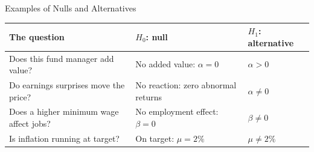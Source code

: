 \documentclass[9pt,english,aspectratio=169]{beamer}
\begin{document}
\begin{frame}{Examples of Nulls and Alternatives}

  \vspace{0.2em}
  {\small
  \begin{tabular}{@{} >{\raggedright\arraybackslash}p{4.9cm}
                       >{\raggedright\arraybackslash}p{4.9cm}
                       >{\raggedright\arraybackslash}p{3cm} @{}}
    \toprule
    \textbf{The question} & \textbf{$H_0$: null} &
      \textbf{$H_1$: alternative} \\[0.3em]
    \midrule
    Does this fund manager add value? &
      No added value: $\alpha = 0$ &
      $\alpha > 0$ \\[0.7em]
    Do earnings surprises move the price? &
      No reaction: zero abnormal returns &
      $\alpha \neq 0$ \\[0.7em]
    Does a higher minimum wage affect jobs? &
      No employment effect: $\beta = 0$ &
      $\beta \neq 0$ \\[0.7em]
    Is inflation running at target? &
      On target: $\mu = 2\%$ &
      $\mu \neq 2\%$ \\[0.3em]
    \bottomrule
  \end{tabular}}


\end{frame}
\end{document}
